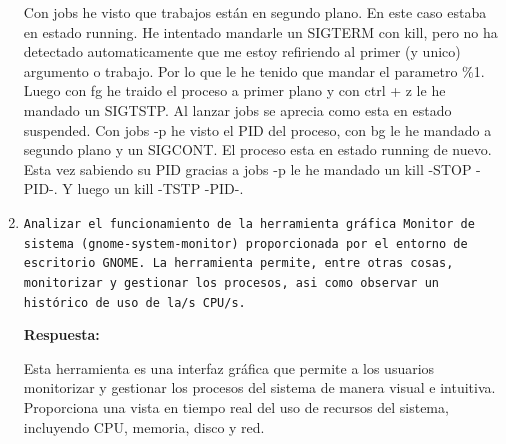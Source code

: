 \documentclass[a4paper,12pt]{article}
\begin{document}
\begin{enumerate}[label=\textbf{Pregunta \arabic*.}]
    Con jobs he visto que trabajos están en segundo plano.
    En este caso estaba en estado running. He intentado mandarle un SIGTERM con kill, pero no ha detectado automaticamente que me estoy refiriendo al primer (y unico) argumento o trabajo. Por lo que le he tenido que mandar el parametro \%1.
    Luego con fg he traido el proceso a primer plano y con ctrl + z le he mandado un SIGTSTP. Al lanzar jobs se aprecia como esta en estado suspended. Con jobs -p he visto el PID del proceso, con bg le he mandado a segundo plano y un SIGCONT. El proceso esta en estado running de nuevo. Esta vez sabiendo su PID gracias a jobs -p le he mandado un kill -STOP -PID-. Y luego un kill -TSTP -PID-.


    \item \texttt{Analizar el funcionamiento de la herramienta gráfica Monitor de sistema (gnome-system-monitor) proporcionada por el entorno de escritorio GNOME. La herramienta permite, entre otras cosas, monitorizar y gestionar los procesos, asi como observar un histórico de uso de la/s CPU/s.}
    
    \textbf{Respuesta:}

    Esta herramienta es una interfaz gráfica que permite a los usuarios monitorizar y gestionar los procesos del sistema de manera visual e intuitiva. Proporciona una vista en tiempo real del uso de recursos del sistema, incluyendo CPU, memoria, disco y red.


\end{enumerate}
\end{document}
